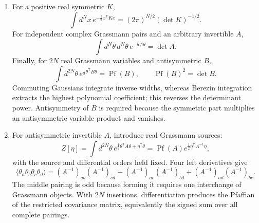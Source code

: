 \begin{enumerate}
\begin{enumerate}
\item
For a positive real symmetric \(K\),
\[
 \int d^Nx\,e^{-\frac12x^{\mathsf T}Kx}
 =(2\pi)^{N/2}(\det K)^{-1/2}.
\]
For independent complex Grassmann pairs and an arbitrary invertible \(A\),
\[
 \int d^N\bar\theta\,d^N\theta\,
 e^{-\bar\theta A\theta}=\det A.
\]
Finally, for \(2N\) real Grassmann variables and antisymmetric \(B\),
\[
 \int d^{2N}\theta\,
 e^{\frac12\theta^{\mathsf T}B\theta}
 =\operatorname{Pf}(B),\qquad
 \operatorname{Pf}(B)^2=\det B.
\]
Commuting Gaussians integrate inverse widths, whereas Berezin integration
extracts the highest polynomial coefficient; this reverses the determinant
power.  Antisymmetry of \(B\) is required because the symmetric part
multiplies an antisymmetric variable product and vanishes.
\item
For antisymmetric invertible \(A\), introduce real Grassmann sources:
\[
 Z[\eta]=\int d^{2N}\theta\,
 e^{\frac12\theta^{\mathsf T}A\theta+\eta^{\mathsf T}\theta}
 =\operatorname{Pf}(A)
 e^{\frac12\eta^{\mathsf T}A^{-1}\eta},
\]
with the source and differential orders held fixed.  Four left
derivatives give
\[
 \langle\theta_a\theta_b\theta_c\theta_d\rangle
 =(A^{-1})_{ab}(A^{-1})_{cd}
 -(A^{-1})_{ac}(A^{-1})_{bd}
 +(A^{-1})_{ad}(A^{-1})_{bc}.
\]
The middle pairing is odd because forming it requires one interchange of
Grassmann objects.  With \(2N\) insertions, differentiation produces the
Pfaffian of the restricted covariance matrix, equivalently the signed sum
over all complete pairings.
\end{enumerate}


\end{enumerate}

